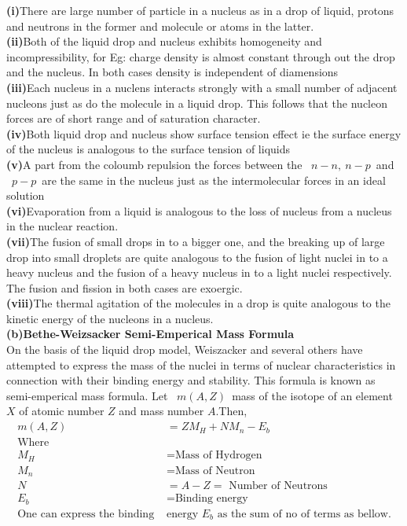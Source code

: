 \textbf{(i)}\quad There are large number of particle in a nucleus as in a drop of liquid, protons and neutrons in the former and molecule or atoms in the latter. \\

\textbf{(ii)}\quad Both of the liquid drop and nucleus exhibits homogeneity and incompressibility, for Eg: charge density is almost constant through out the drop and the nucleus. In both cases density is independent of diamensions \\

\textbf{(iii)}\quad Each nucleus in a nuclens interacts strongly with a small number of adjacent nucleons just as do the molecule in a liquid drop. This follows that the nucleon forces are of short range and of saturation character.\\

\textbf{(iv)}\quad Both liquid drop and nucleus show surface tension effect ie the surface energy of the nucleus is analogous to the surface tension of liquids \\

\textbf{(v)}\quad A part  from the coloumb repulsion the forces between the \ $n-n,\ n-p$\ and \ $p-p$\ are the same in the nucleus just as the intermolecular forces in an ideal solution\\

\textbf{(vi)}\quad Evaporation from a liquid is analogous to the loss of nucleus from a nucleus in the nuclear reaction.\\

\textbf{(vii)}\quad The fusion of small drops in to a bigger one, and the breaking up of large drop into small droplets are quite analogous to the fusion of light nuclei in to a heavy nucleus and the fusion of a heavy nucleus in to a light nuclei respectively. The fusion and fission in both cases are exoergic.\\

\textbf{(viii)}\quad The thermal agitation of the molecules in a drop is quite analogous to the kinetic energy of the nucleons in a nucleus.\\

\textbf{(b)\quad Bethe-Weizsacker Semi-Emperical Mass Formula}\\
On the basis of the liquid drop model, Weiszacker and several others have attempted to express the mass of the nuclei in terms of nuclear characteristics in connection with their binding energy and stability. This formula is known as semi-emperical mass formula. Let \ $m(A,Z)$\ mass of the isotope of an element $X$ of atomic number $Z$ and mass number $A$.Then,
\begin{align*}
m(A,Z)&=ZM_H+NM_n-E_b\\
\text{Where}\\
M_H&=\text{Mass of Hydrogen}\\
M_n&=\text{Mass of Neutron}\\
N&=A-Z=\text{ Number of Neutrons}\\
E_b&=\text{Binding energy}\\
\text{One can express the binding }&\text{energy $E_b$ as the sum of no of terms as bellow.}\\
\end{align*}

